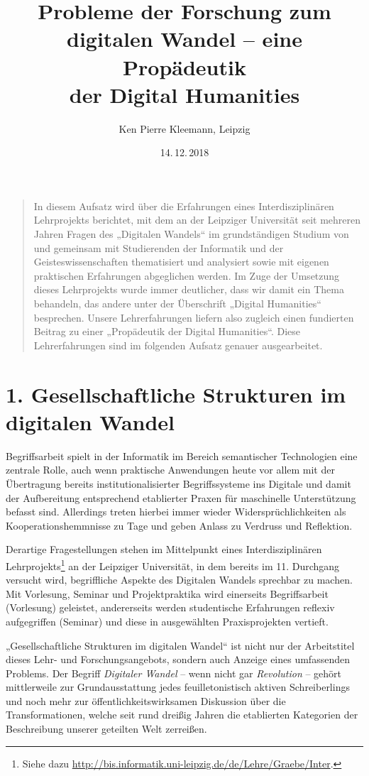 \documentclass[a4paper,11pt]{article}
\title{Probleme der Forschung zum\\ digitalen Wandel – eine Propädeutik\\ der
  Digital Humanities}
\author{Ken Pierre Kleemann, Leipzig}
\date{14.\,12.\,2018}
\begin{document}
\maketitle

\begin{quote}
In diesem Aufsatz wird über die Erfahrungen eines Interdisziplinären
Lehrprojekts berichtet, mit dem an der Leipziger Universität seit mehreren
Jahren Fragen des „Digitalen Wandels“ im grundständigen Studium von und
gemeinsam mit Studierenden der Informatik und der Geisteswissenschaften
thematisiert und analysiert sowie mit eigenen praktischen Erfahrungen
abgeglichen werden.  Im Zuge der Umsetzung dieses Lehrprojekts wurde immer
deutlicher, dass wir damit ein Thema behandeln, das andere unter der
Überschrift „Digital Humanities“ besprechen. Unsere Lehrerfahrungen liefern
also zugleich einen fundierten Beitrag zu einer „Propädeutik der Digital
Humanities“. Diese Lehrerfahrungen sind im folgenden Aufsatz genauer
ausgearbeitet.
\end{quote}

\section*{1. Gesellschaftliche Strukturen im digitalen Wandel}

Begriffsarbeit spielt in der Informatik im Bereich semantischer Technologien
eine zentrale Rolle, auch wenn praktische Anwendungen heute vor allem mit der
Übertragung bereits institutionalisierter Begriffssysteme ins Digitale und
damit der Aufbereitung entsprechend etablierter Praxen für maschinelle
Unterstützung befasst sind. Allerdings treten hierbei immer wieder
Widersprüchlichkeiten als Kooperationshemmnisse zu Tage und geben Anlass zu
Verdruss und Reflektion.

Derartige Fragestellungen stehen im Mittelpunkt eines Interdisziplinären
Lehrprojekts\footnote{Siehe dazu
  \url{http://bis.informatik.uni-leipzig.de/de/Lehre/Graebe/Inter}.} an der
Leipziger Universität, in dem bereits im 11. Durchgang versucht wird,
begriffliche Aspekte des Digitalen Wandels sprechbar zu machen. Mit Vorlesung,
Seminar und Projektpraktika wird einerseits Begriffsarbeit (Vorlesung)
geleistet, andererseits werden studentische Erfahrungen reflexiv aufgegriffen
(Seminar) und diese in ausgewählten Praxisprojekten vertieft.

„Gesellschaftliche Strukturen im digitalen Wandel“ ist nicht nur der
Arbeitstitel dieses Lehr- und Forschungsangebots, sondern auch Anzeige eines
umfassenden Problems. Der Begriff \emph{Digitaler Wandel} -- wenn nicht gar
\emph{Revolution} -- gehört mittlerweile zur Grundausstattung jedes
feuilletonistisch aktiven Schreiberlings und noch mehr zur
öffentlichkeitswirksamen Diskussion über die Transformationen, welche seit
rund dreißig Jahren die etablierten Kategorien der Beschreibung unserer
geteilten Welt zerreißen.
\end{document}
